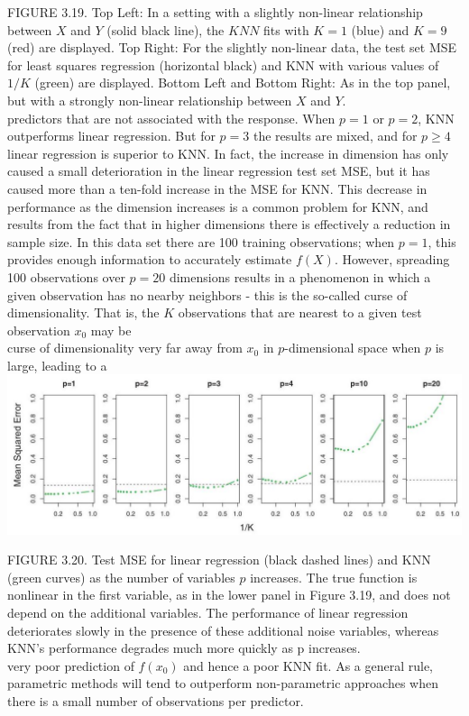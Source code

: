 \documentclass[10pt]{article}
\begin{document}
FIGURE 3.19. Top Left: In a setting with a slightly non-linear relationship between $X$ and $Y$ (solid black line), the $K N N$ fits with $K=1$ (blue) and $K=9$ (red) are displayed. Top Right: For the slightly non-linear data, the test set MSE for least squares regression (horizontal black) and KNN with various values of $1 / K$ (green) are displayed. Bottom Left and Bottom Right: As in the top panel, but with a strongly non-linear relationship between $X$ and $Y$.\\
predictors that are not associated with the response. When $p=1$ or $p=2$, KNN outperforms linear regression. But for $p=3$ the results are mixed, and for $p \geq 4$ linear regression is superior to KNN. In fact, the increase in dimension has only caused a small deterioration in the linear regression test set MSE, but it has caused more than a ten-fold increase in the MSE for KNN. This decrease in performance as the dimension increases is a common problem for KNN, and results from the fact that in higher dimensions there is effectively a reduction in sample size. In this data set there are 100 training observations; when $p=1$, this provides enough information to accurately estimate $f(X)$. However, spreading 100 observations over $p=20$ dimensions results in a phenomenon in which a given observation has no nearby neighbors - this is the so-called curse of dimensionality. That is, the $K$ observations that are nearest to a given test observation $x_{0}$ may be\\
curse of dimensionality very far away from $x_{0}$ in $p$-dimensional space when $p$ is large, leading to a\\
\includegraphics[max width=\textwidth, center]{2025_05_05_efe77898333945044de4g-124}

FIGURE 3.20. Test MSE for linear regression (black dashed lines) and KNN (green curves) as the number of variables $p$ increases. The true function is nonlinear in the first variable, as in the lower panel in Figure 3.19, and does not depend on the additional variables. The performance of linear regression deteriorates slowly in the presence of these additional noise variables, whereas KNN's performance degrades much more quickly as p increases.\\
very poor prediction of $f\left(x_{0}\right)$ and hence a poor KNN fit. As a general rule, parametric methods will tend to outperform non-parametric approaches when there is a small number of observations per predictor.
\end{document}
